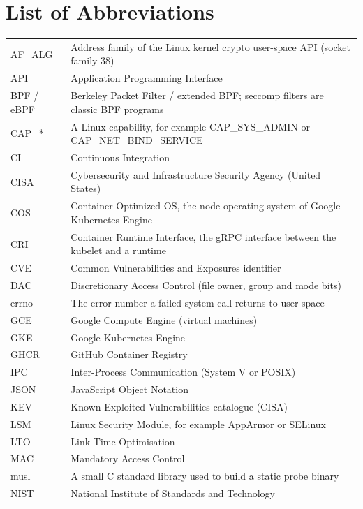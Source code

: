 \chapter*{List of Abbreviations}

\begingroup\renewcommand{\arraystretch}{1.0}
\begin{longtable}{@{}p{3.3cm}p{11.9cm}@{}}
AF\_ALG & Address family of the Linux kernel crypto user-space API (socket family 38)\\
API & Application Programming Interface\\
BPF / eBPF & Berkeley Packet Filter / extended BPF; seccomp filters are classic BPF programs\\
CAP\_* & A Linux capability, for example CAP\_SYS\_ADMIN or CAP\_NET\_BIND\_SERVICE\\
CI & Continuous Integration\\
CISA & Cybersecurity and Infrastructure Security Agency (United States)\\
COS & Container-Optimized OS, the node operating system of Google Kubernetes Engine\\
CRI & Container Runtime Interface, the gRPC interface between the kubelet and a runtime\\
CVE & Common Vulnerabilities and Exposures identifier\\
DAC & Discretionary Access Control (file owner, group and mode bits)\\
errno & The error number a failed system call returns to user space\\
GCE & Google Compute Engine (virtual machines)\\
GKE & Google Kubernetes Engine\\
GHCR & GitHub Container Registry\\
IPC & Inter-Process Communication (System V or POSIX)\\
JSON & JavaScript Object Notation\\
KEV & Known Exploited Vulnerabilities catalogue (CISA)\\
LSM & Linux Security Module, for example AppArmor or SELinux\\
LTO & Link-Time Optimisation\\
MAC & Mandatory Access Control\\
musl & A small C standard library used to build a static probe binary\\
NIST & National Institute of Standards and Technology\\

\end{longtable}
